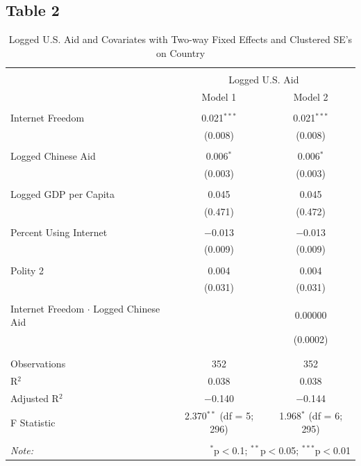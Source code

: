 \documentclass[12pt]{article}
\begin{document}
\subsection*{Table 2}
\begin{table}[!htbp] \centering 
  \caption*{Logged U.S. Aid and Covariates with Two-way Fixed Effects and Clustered SE's on Country} 
  \label{} 
\begin{tabular}{@{\extracolsep{5pt}}lcc} 
\\[-1.8ex]\hline 
\hline \\[-1.8ex] 
 & \multicolumn{2}{c}{Logged U.S. Aid} \\ 
\cline{2-3} 
 & Model 1 & Model 2 \\ 
\hline \\[-1.8ex] 
 Internet Freedom & 0.021$^{***}$ & 0.021$^{***}$ \\ 
  & (0.008) & (0.008) \\ 
  & & \\ 
 Logged Chinese Aid & 0.006$^{*}$ & 0.006$^{*}$ \\ 
  & (0.003) & (0.003) \\ 
  & & \\ 
 Logged GDP per Capita & 0.045 & 0.045 \\ 
  & (0.471) & (0.472) \\ 
  & & \\ 
 Percent Using Internet & $-$0.013 & $-$0.013 \\ 
  & (0.009) & (0.009) \\ 
  & & \\ 
 Polity 2 & 0.004 & 0.004 \\ 
  & (0.031) & (0.031) \\ 
  & & \\ 
 Internet Freedom $\cdot$ Logged Chinese Aid &  & 0.00000 \\ 
  &  & (0.0002) \\ 
  & & \\ 
\hline \\[-1.8ex] 
Observations & 352 & 352 \\ 
R$^{2}$ & 0.038 & 0.038 \\ 
Adjusted R$^{2}$ & $-$0.140 & $-$0.144 \\ 
F Statistic & 2.370$^{**}$ (df = 5; 296) & 1.968$^{*}$ (df = 6; 295) \\ 
\hline 
\hline \\[-1.8ex] 
\textit{Note:}  & \multicolumn{2}{r}{$^{*}$p$<$0.1; $^{**}$p$<$0.05; $^{***}$p$<$0.01} \\ 
\end{tabular} 
\end{table}
\end{document}
